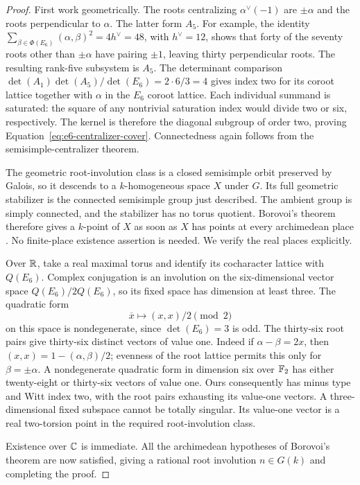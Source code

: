 \begin{proof}
First work geometrically.  The roots centralizing $\alpha^\vee(-1)$ are
$\pm\alpha$ and the roots perpendicular to $\alpha$.  The latter form
$A_5$.  For example, the identity
$\sum_{\beta\in\Phi(E_6)}(\alpha,\beta)^2=4h^\vee=48$, with
$h^\vee=12$, shows that forty of the seventy roots other than
$\pm\alpha$ have pairing $\pm1$, leaving thirty perpendicular roots.
The resulting rank-five subsystem is $A_5$.  The determinant comparison
$\det(A_1)\det(A_5)/\det(E_6)=2\cdot6/3=4$ gives index two for its
coroot lattice together with $\alpha$ in the $E_6$ coroot lattice.
Each individual summand is saturated: the square of any nontrivial
saturation index would divide two or six, respectively.  The kernel is
therefore the diagonal subgroup of order two, proving
Equation~\eqref{eq:e6-centralizer-cover}.  Connectedness again follows
from the semisimple-centralizer theorem.

The geometric root-involution class is a closed semisimple orbit
preserved by Galois, so it descends to a $k$-homogeneous space $X$ under
$G$.  Its full geometric stabilizer is the connected semisimple group
just described.  The ambient group is simply connected, and the
stabilizer has no torus quotient.  Borovoi's theorem therefore gives a
$k$-point of $X$ as soon as $X$ has points at every archimedean place
\cite[Proposition~3.4(i)]{Borovoi}.  No finite-place existence assertion
is needed.  We verify the real places explicitly.

Over $\mathbb R$, take a real maximal torus and identify its cocharacter
lattice with $Q(E_6)$.  Complex conjugation is an involution on the
six-dimensional vector space $Q(E_6)/2Q(E_6)$, so its fixed space has
dimension at least three.  The quadratic form
\[
 \overline x\longmapsto (x,x)/2\pmod2
\]
on this space is nondegenerate, since $\det(E_6)=3$ is odd.  The
thirty-six root pairs give thirty-six distinct vectors of value one.
Indeed if $\alpha-\beta=2x$, then
$(x,x)=1-(\alpha,\beta)/2$; evenness of the root lattice permits this
only for $\beta=\pm\alpha$.  A nondegenerate quadratic form in dimension
six over $\mathbb F_2$ has either twenty-eight or thirty-six vectors of value
one.  Ours consequently has minus type and Witt index two, with the root
pairs exhausting its value-one vectors.  A three-dimensional fixed
subspace cannot be totally singular.  Its value-one vector is a real
two-torsion point in the required root-involution class.

Existence over $\mathbb C$ is immediate.  All the archimedean hypotheses of
Borovoi's theorem are now satisfied, giving a rational root involution
$n\in G(k)$ and completing the proof.
\end{proof}

